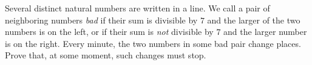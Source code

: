 \problem{}
Several distinct natural numbers are written in a line.
We call a pair of neighboring numbers \emph{bad} if their sum is divisible by $7$ and
the larger of the two numbers is on the left, or if their sum is \emph{not} divisible
by $7$ and the larger number is on the right.
Every minute, the two numbers in some bad pair change places.
Prove that, at some moment, such changes must stop.
\solution
\endproblem
